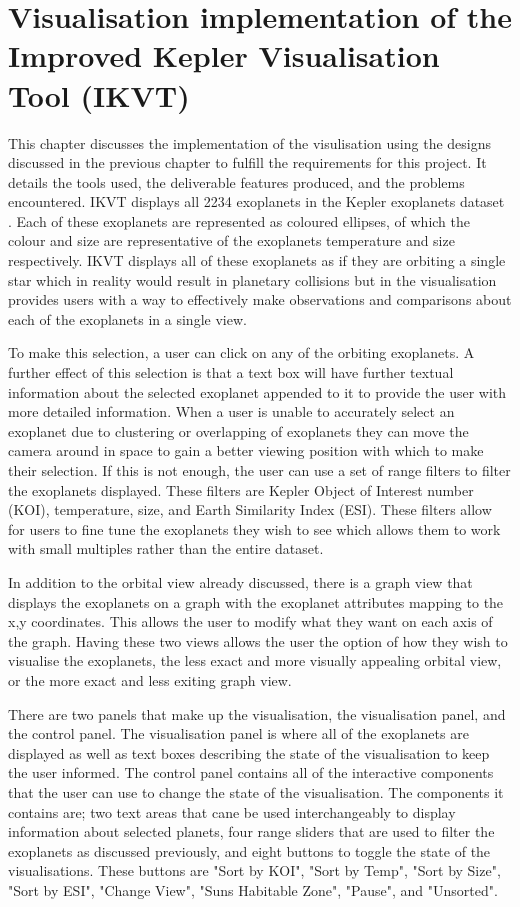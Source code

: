 \chapter{Visualisation implementation of the Improved Kepler Visualisation Tool (IKVT)}\label{C:sd}
This chapter discusses the implementation of the visulisation using the designs
discussed in the previous chapter to fulfill the requirements for this project. It details the tools used, the deliverable features
produced, and the problems encountered. IKVT displays all 2234 exoplanets
in the Kepler exoplanets dataset \cite{dataset}. Each of these exoplanets are represented as coloured
ellipses, of which the colour and size are representative of the exoplanets
temperature and size respectively. IKVT displays all of these exoplanets as if
they are orbiting a single star which in reality would result in planetary
collisions but in the visualisation provides users with a way to effectively
make observations and comparisons about each of the exoplanets in a single
view. 

To make this selection, a user can click on any of the orbiting exoplanets.  A
further effect of this selection is that a text box will have further textual
information about the selected exoplanet appended to it to provide the user with
more detailed information. When a user is unable to accurately select an exoplanet due to clustering or
overlapping of exoplanets they can move the camera around in space to gain a
better viewing position with which to make their selection. If this is not
enough, the user can use a set of range filters to filter the exoplanets
displayed. These filters are Kepler Object of Interest number (KOI),
temperature, size, and Earth Similarity Index (ESI). These filters allow for
users to fine tune the exoplanets they wish to see which allows them to work
with small multiples rather than the entire dataset.

In addition to the orbital view already discussed, there is a graph view that
displays the exoplanets on a graph with the exoplanet attributes mapping to the
x,y coordinates. This allows the user to modify what they want on each axis of
the graph. Having these two views allows the user the option of how they wish to
visualise the exoplanets, the less exact and more visually appealing orbital
view, or the more exact and less exiting graph view.

There are two panels that make up the visualisation, the visualisation panel,
and the control panel. The visualisation panel is where all of the exoplanets
are displayed as well as text boxes describing the state of the visualisation to
keep the user informed. The control panel contains all of the interactive
components that the user can use to change the state of the visualisation. The
components it contains are; two text areas that cane be used interchangeably to
display information about selected planets, four range sliders that are used to
filter the exoplanets as discussed previously, and eight buttons to toggle the
state of the visualisations. These buttons are "Sort by KOI", "Sort by Temp",
"Sort by Size", "Sort by ESI", "Change View", "Suns Habitable Zone", "Pause",
and "Unsorted". ~

